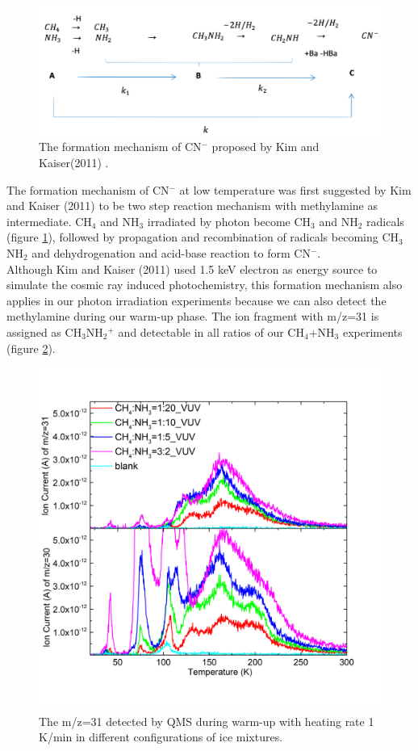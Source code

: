 \begin{figure}
\centering
\includegraphics[width=\textwidth]{figures/chapter3/CNmechanism}
\caption{The formation mechanism of CN$^-$ proposed by Kim and Kaiser(2011)\cite{kim} .}
\label{fig:CNmechanism}
\end{figure}

The formation mechanism of CN$^-$ at low temperature was first suggested by Kim and Kaiser (2011) \cite{kim} to be two step reaction mechanism with methylamine as intermediate. CH$_4$ and NH$_3$ irradiated by photon become CH$_3$ and NH$_2$ radicals (figure \ref{fig:CNmechanism}), followed by propagation and recombination of radicals becoming CH$_3$NH$_2$ and dehydrogenation and acid-base reaction to form CN$^-$. \\

Although Kim and Kaiser (2011) \cite{kim} used 1.5 keV electron as energy source to simulate the cosmic ray induced photochemistry, this formation mechanism also applies in our photon irradiation experiments because we can also detect the methylamine during our warm-up phase. The ion fragment with m/z=31 is assigned as CH$_3$NH$_2$$^+$ and detectable in all ratios of our CH$_4$+NH$_3$ experiments (figure \ref{Mass31}).


\begin{figure}
\centering
\includegraphics[width=\textwidth]{figures/chapter3/mass31.png}
\caption{The m/z=31 detected by QMS during warm-up with heating rate 1 K/min in different configurations of ice mixtures.}
\label{Mass31}
\end{figure}

